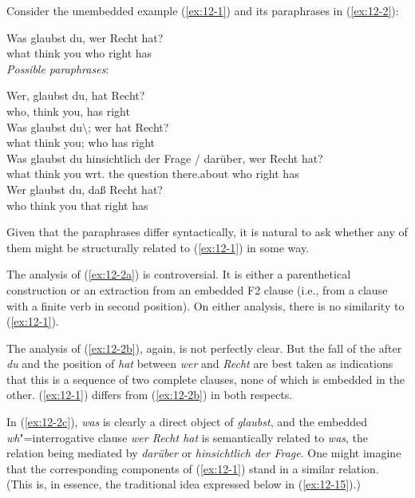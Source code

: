 \documentclass[output=paper]{langsci/langscibook}
\begin{document}
\settowidth{\jamwidth}{(10)} 
Consider the unembedded example (\ref{ex:12-1}) and its paraphrases in (\ref{ex:12-2}): 
\begin{exe}
\ex
\label{ex:12-1}
\gll
Was glaubst du, wer Recht hat? \\
what think you who right has \\
\ex
\label{ex:12-2}
\textit{Possible paraphrases}: 
\begin{xlist}
\ex
\label{ex:12-2a}
\gll
Wer, glaubst du, hat Recht? \\
who, think you, has right \\
\ex
\label{ex:12-2b}
\gll
Was glaubst du$\setminus$; wer hat Recht? \\
what think you; who has right \\
\ex
\label{ex:12-2c}
\gll
Was glaubst du hinsichtlich der Frage / darüber, wer Recht hat? \\
what think you wrt. the question {} {there.about} who right has \\
\ex
\label{ex:12-2d}
\gll
Wer glaubst du, daß Recht hat? \\
who think you that right has \\
\end{xlist}
\end{exe}
Given that the paraphrases differ syntactically, it is natural to ask
whether any of them might be structurally related to (\ref{ex:12-1}) in some way.

The analysis of (\ref{ex:12-2a}) is controversial. It is either a parenthetical
construction or an extraction from an embedded F2 clause (i.e., from a
clause with a finite verb in second position). On either analysis,
there is no similarity to (\ref{ex:12-1}).

The analysis of (\ref{ex:12-2b}), again, is not perfectly clear. But the fall of
the  after \textit{du} and the position of \textit{hat}
between \textit{wer} and \textit{Recht} are best taken as indications
that this is a sequence of two complete clauses, none of which is
embedded in the other. (\ref{ex:12-1}) differs from (\ref{ex:12-2b}) in both respects.

In (\ref{ex:12-2c}), \textit{was} is clearly a direct object of \textit{glaubst},
and the embedded \textit{wh}"=interrogative clause \textit{wer Recht
  hat} is semantically related to \textit{was}, the relation being
mediated by \textit{darüber} or \textit{hinsichtlich der Frage}. One
might imagine that the corresponding components of (\ref{ex:12-1}) stand in a
similar relation.  (This is, in essence, the traditional idea
expressed below in (\ref{ex:12-15}).)
\end{document}
